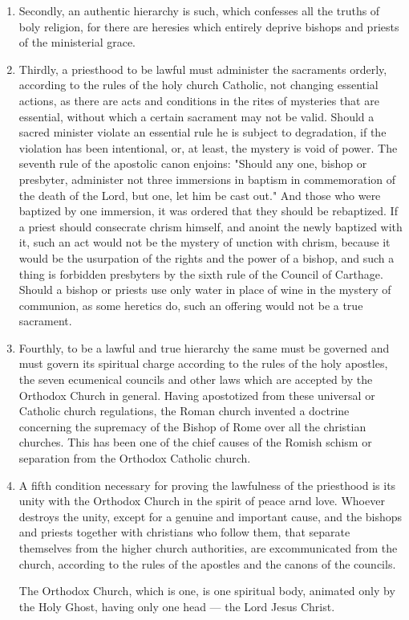 \begin{enumerate}
    \item Secondly, an authentic hierarchy is such, 
    which confesses all the truths of boly religion, 
    for there are heresies which entirely deprive 
    bishops and priests of the ministerial grace. 

    \item Thirdly, a priesthood to be lawful must 
    administer the sacraments orderly, according 
    to the rules of the holy church Catholic, not 
    changing essential actions, as there are acts and 
    conditions in the rites of mysteries that are essential,
    without which a certain sacrament may 
    not be valid. Should a sacred minister violate 
    an essential rule he is subject to degradation, if 
    the violation has been intentional, or, at least, 
    the mystery is void of power. The seventh 
    rule of the apostolic canon enjoins: "Should 
    any one, bishop or presbyter, administer not 
    three immersions in baptism in commemoration 
    of the death of the Lord, but one, let him be cast 
    out." And those who were baptized by one 
    immersion, it was ordered that they should be 
    rebaptized. If a priest should consecrate 
    chrism himself, and anoint the newly baptized 
    with it, such an act would not be the mystery of 
    unction with chrism, because it would be the 
    usurpation of the rights and the power of a 
    bishop, and such a thing is forbidden presbyters
    by the sixth rule of the Council of Carthage.
    Should a bishop or priests use only water 
    in place of wine in the mystery of communion, 
    as some heretics do, such an offering would not 
    be a true sacrament. 

    \item Fourthly, to be a lawful and true hierarchy
    the same must be governed and must govern 
    its spiritual charge according to the rules of the 
    holy apostles, the seven ecumenical councils 
    and other laws which are accepted by the 
    Orthodox Church in general. Having apostotized
    from these universal or Catholic church 
    regulations, the Roman church invented a 
    doctrine concerning the supremacy of the 
    Bishop of Rome over all the christian churches. 
    This has been one of the chief causes of the 
    Romish schism or separation from the Orthodox
    Catholic church. 

    \item A fifth condition necessary for proving the 
    lawfulness of the priesthood is its unity with 
    the Orthodox Church in the spirit of peace arnd 
    love. Whoever destroys the unity, except for 
    a genuine and important cause, and the bishops 
    and priests together with christians who follow 
    them, that separate themselves from the higher 
    church authorities, are excommunicated from 
    the church, according to the rules of the 
    apostles and the canons of the councils. 

    The Orthodox Church, which is one, is one 
    spiritual body, animated only by the Holy 
    Ghost, having only one head — the Lord Jesus 
    Christ. 
\end{enumerate}

